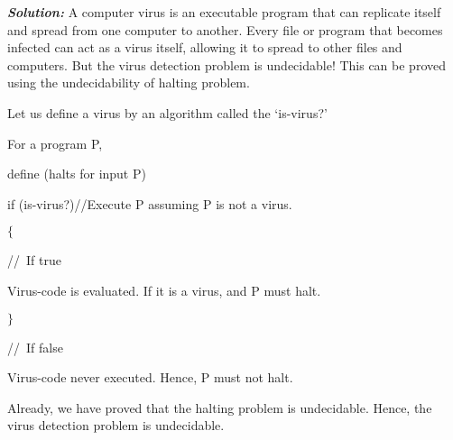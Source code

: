 \documentclass[10pt,a4paper]{book}
\begin{document}
\textbf{\textit{\!\!\!\!\!\!\!\!\!\!Solution:}} A computer virus is an executable program that can replicate itself and spread from one
computer to another. Every file or program that becomes infected can act as a virus itself, allowing it to spread to other files and computers. But the virus detection problem is undecidable! This can be proved
using the undecidability of halting problem.

Let us define a virus by an algorithm called the ‘is-virus?’

\quad

For a program P,

define (halts for input P)

\qquad\qquad if (is-virus?)\quad\qquad //Execute P assuming P is not a virus.

\qquad\qquad $\{$

\qquad\qquad\; //\, If true


\qquad\qquad\; Virus-code is evaluated. If it is a virus, and P must halt.

\qquad\qquad $\}$

\qquad\qquad\; //\, If false

\qquad\qquad\; Virus-code never executed. Hence, P must not halt.

\qquad

Already, we have proved that the halting problem is undecidable. Hence, the virus detection problem
is undecidable.
\end{document}
